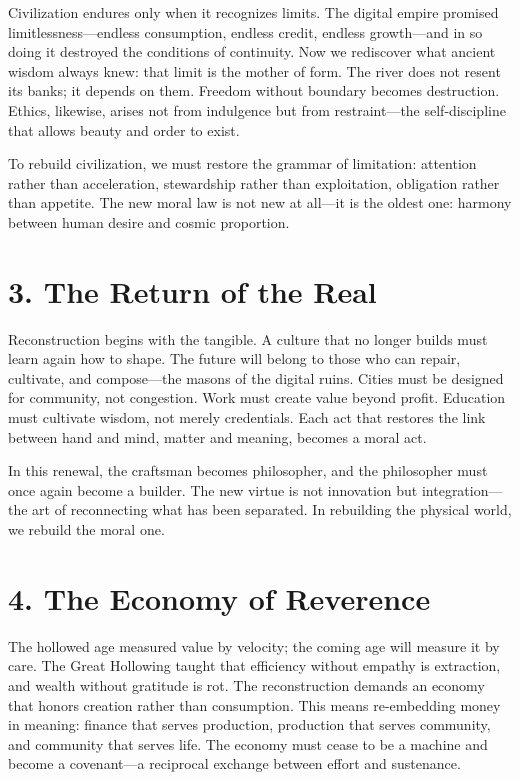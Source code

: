 \documentclass[11pt,twoside]{book}
\begin{document}
Civilization endures only when it recognizes limits.  
The digital empire promised limitlessness—endless consumption, endless credit, endless growth—and in so doing it destroyed the conditions of continuity.  
Now we rediscover what ancient wisdom always knew: that limit is the mother of form.  
The river does not resent its banks; it depends on them.  
Freedom without boundary becomes destruction.  
Ethics, likewise, arises not from indulgence but from restraint—the self-discipline that allows beauty and order to exist.

To rebuild civilization, we must restore the grammar of limitation: attention rather than acceleration, stewardship rather than exploitation, obligation rather than appetite.  
The new moral law is not new at all—it is the oldest one: harmony between human desire and cosmic proportion.

\section*{3. The Return of the Real}

Reconstruction begins with the tangible.  
A culture that no longer builds must learn again how to shape.  
The future will belong to those who can repair, cultivate, and compose—the masons of the digital ruins.  
Cities must be designed for community, not congestion.  
Work must create value beyond profit.  
Education must cultivate wisdom, not merely credentials.  
Each act that restores the link between hand and mind, matter and meaning, becomes a moral act.

In this renewal, the craftsman becomes philosopher, and the philosopher must once again become a builder.  
The new virtue is not innovation but integration—the art of reconnecting what has been separated.  
In rebuilding the physical world, we rebuild the moral one.

\section*{4. The Economy of Reverence}

The hollowed age measured value by velocity; the coming age will measure it by care.  
The Great Hollowing taught that efficiency without empathy is extraction, and wealth without gratitude is rot.  
The reconstruction demands an economy that honors creation rather than consumption.  
This means re-embedding money in meaning:  
finance that serves production, production that serves community, and community that serves life.  
The economy must cease to be a machine and become a covenant—a reciprocal exchange between effort and sustenance.
\end{document}
